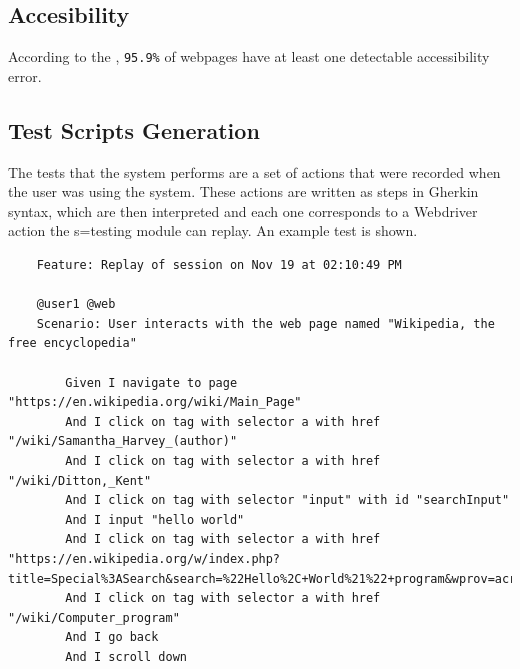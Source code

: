 
\subsection{Accesibility}

According to the \cite{techreport:webaim-2024}, \verb|95.9%| of webpages have at least one detectable accessibility error.



\subsection{Test Scripts Generation}

The tests that the system performs are a set of actions that were recorded when the user was using the system. These actions are written as steps in Gherkin syntax, which are then interpreted and each one corresponds to a Webdriver action the s=testing module can replay. An example test is shown.

\begin{lstlisting}
    Feature: Replay of session on Nov 19 at 02:10:49 PM

    @user1 @web
    Scenario: User interacts with the web page named "Wikipedia, the free encyclopedia"
    
        Given I navigate to page "https://en.wikipedia.org/wiki/Main_Page"
        And I click on tag with selector a with href "/wiki/Samantha_Harvey_(author)"
        And I click on tag with selector a with href "/wiki/Ditton,_Kent"
        And I click on tag with selector "input" with id "searchInput"
        And I input "hello world"
        And I click on tag with selector a with href "https://en.wikipedia.org/w/index.php?title=Special%3ASearch&search=%22Hello%2C+World%21%22+program&wprov=acrw1_0"
        And I click on tag with selector a with href "/wiki/Computer_program"
        And I go back
        And I scroll down
\end{lstlisting}
